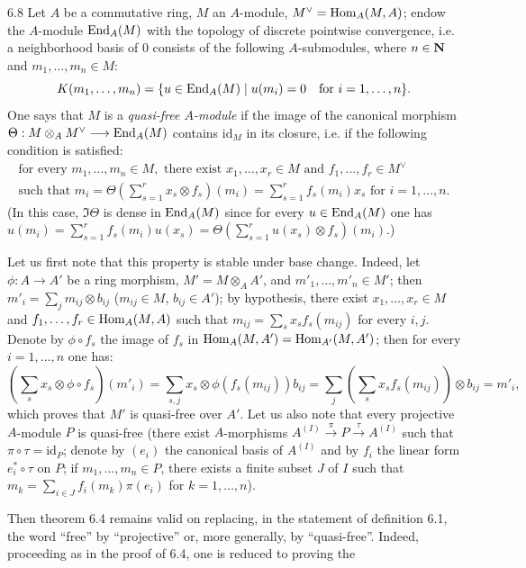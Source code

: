 \begin{remark}{6.8}\label{VIII.6.8}
 Let $A$ be a commutative ring, $M$ an $A$-module, $M^\vee=\operatorname{Hom}_A(M,A)$; endow the $A$-module $\operatorname{End}_A(M)$ with the topology of discrete pointwise convergence, i.e. a neighborhood basis of 0 consists of the following $A$-submodules, where $n\in\mathbf{N}$ and $m_1,\dots,m_n\in M$:
\[
K(m_1,\dots,m_n)=\{u\in\operatorname{End}_A(M)\mid u(m_i)=0\quad\text{for }i=1,\dots,n\}.
\]
One says that $M$ is a \emph{quasi-free $A$-module} if the image of the canonical morphism $\Theta:M\otimes_A M^\vee\longrightarrow\operatorname{End}_A(M)$ contains $\mathrm{id}_M$ in its closure, i.e. if the following condition is satisfied:
\begin{equation}\tag{*}
\begin{gathered}
\text{for every }m_1,\dots,m_n\in M,\text{ there exist }x_1,\dots,x_r\in M\text{ and }f_1,\dots,f_r\in M^\vee\\
\text{such that }m_i=\Theta\left(\sum_{s=1}^r x_s\otimes f_s\right)(m_i)=\sum_{s=1}^r f_s(m_i)x_s\text{ for }i=1,\dots,n.
\end{gathered}
\end{equation}
(In this case, $\Im\Theta$ is dense in $\operatorname{End}_A(M)$ since for every $u\in\operatorname{End}_A(M)$ one has $u(m_i)=\sum_{s=1}^r f_s(m_i)u(x_s)=\Theta(\sum_{s=1}^r u(x_s)\otimes f_s)(m_i)$.)

Let us first note that this property is stable under base change. Indeed, let $\phi:A\to A'$ be a ring morphism, $M'=M\otimes_A A'$, and $m'_1,\dots,m'_n\in M'$; then $m'_i=\sum_j m_{ij}\otimes b_{ij}$ ($m_{ij}\in M$, $b_{ij}\in A'$); by hypothesis, there exist $x_1,\dots,x_r\in M$ and $f_1,\dots,f_r\in\operatorname{Hom}_A(M,A)$ such that $m_{ij}=\sum_s x_sf_s(m_{ij})$ for every $i,j$. Denote by $\phi\circ f_s$ the image of $f_s$ in $\operatorname{Hom}_A(M,A')=\operatorname{Hom}_{A'}(M,A')$; then for every $i=1,\dots,n$ one has:
\[
\left(\sum_s x_s\otimes\phi\circ f_s\right)(m'_i)=\sum_{s,j}x_s\otimes\phi(f_s(m_{ij}))b_{ij}=\sum_j\left(\sum_s x_sf_s(m_{ij})\right)\otimes b_{ij}=m'_i,
\]
which proves that $M'$ is quasi-free over $A'$.
Let us also note that every projective $A$-module $P$ is quasi-free (there exist $A$-morphisms $A^{(I)}\xrightarrow{\pi}P\xrightarrow{\tau}A^{(I)}$ such that $\pi\circ\tau=\mathrm{id}_P$; denote by $(e_i)$ the canonical basis of $A^{(I)}$ and by $f_i$ the linear form $e_i^*\circ\tau$ on $P$; if $m_1,\dots,m_n\in P$, there exists a finite subset $J$ of $I$ such that $m_k=\sum_{i\in J}f_i(m_k)\pi(e_i)$ for $k=1,\dots,n$).

Then theorem 6.4 remains valid on replacing, in the statement of definition 6.1, the word ``free'' by ``projective'' or, more generally, by ``quasi-free''. Indeed, proceeding as in the proof of 6.4, one is reduced to proving the
\end{remark}
